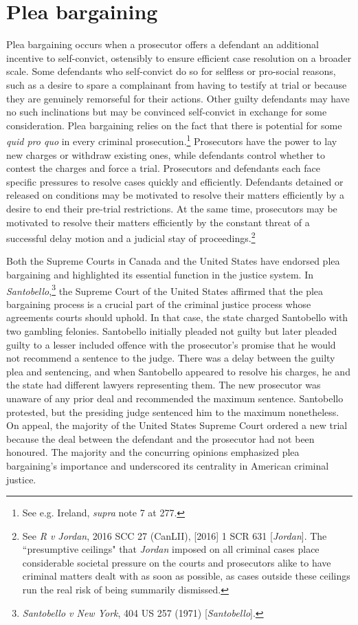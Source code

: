 \section{Plea bargaining}

Plea bargaining occurs when a prosecutor offers a defendant an additional incentive to self-convict, ostensibly to ensure efficient case resolution on a broader scale. Some defendants who self-convict do so for selfless or pro-social reasons, such as a desire to spare a complainant from having to testify at trial or because they are genuinely remorseful for their actions. Other guilty defendants may have no such inclinations but may be convinced self-convict in exchange for some consideration. Plea bargaining relies on the fact that there is potential for some \textit{quid pro quo} in every criminal prosecution.\footnote{See e.g. Ireland, \textit{supra} note 7 at 277.} Prosecutors have the power to lay new charges or withdraw existing ones, while defendants control whether to contest the charges and force a trial. Prosecutors and defendants each face specific pressures to resolve cases quickly and efficiently. Defendants detained or released on conditions may be motivated to resolve their matters efficiently by a desire to end their pre-trial restrictions. At the same time, prosecutors may be motivated to resolve their matters efficiently by the constant threat of a successful delay motion and a judicial stay of proceedings.\footnote{See \textit{R v Jordan}, 2016 SCC 27 (CanLII), [2016] 1 SCR 631 [\textit{Jordan}]. The ``presumptive ceilings" that \textit{Jordan} imposed on all criminal cases place considerable societal pressure on the courts and prosecutors alike to have criminal matters dealt with as soon as possible, as cases outside these ceilings run the real risk of being summarily dismissed.}

Both the Supreme Courts in Canada and the United States have endorsed plea bargaining and highlighted its essential function in the justice system. In \textit{Santobello},\footnote{\textit{Santobello v New York}, 404 US 257 (1971) [\textit{Santobello}].} the Supreme Court of the United States affirmed that the plea bargaining process is a crucial part of the criminal justice process whose agreements courts should uphold. In that case, the state charged Santobello with two gambling felonies. Santobello initially pleaded not guilty but later pleaded guilty to a lesser included offence with the prosecutor's promise that he would not recommend a sentence to the judge. There was a delay between the guilty plea and sentencing, and when Santobello appeared to resolve his charges, he and the state had different lawyers representing them. The new prosecutor was unaware of any prior deal and recommended the maximum sentence. Santobello protested, but the presiding judge sentenced him to the maximum nonetheless. On appeal, the majority of the United States Supreme Court ordered a new trial because the deal between the defendant and the prosecutor had not been honoured. The majority and the concurring opinions emphasized plea bargaining's importance and underscored its centrality in American criminal justice.

